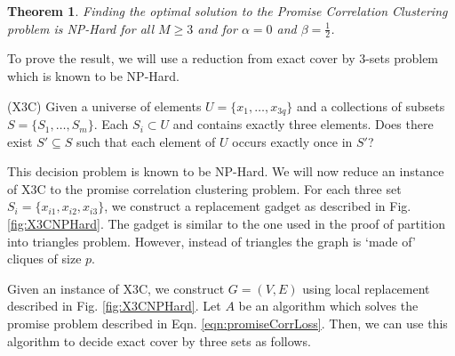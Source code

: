 \documentclass[12pt]{article}
\newtheorem{theorem}{Theorem}
\begin{document}
\begin{figure*}[!ht]
\caption{Part of graph $G$ constructed for the subset $S_i =  \{x_{i1}, x_{i2}, x_{i3}\}$. The graph is constructed by local replacement when for $p = 4$. If $S_i$ is included in the exact cover then the edges colored black and the edges colored blue represent the corresponding clustering of this part of the graph $G$. If $S_i$ is not included in the exact cover then the edges colored red and the edges colored black represent the clustering of this part of the graph.}
\label{fig:X3CNPHard}
\end{figure*}

\begin{theorem}
Finding the optimal solution to the Promise Correlation Clustering problem is NP-Hard for all $M \ge 3$ and for $\alpha = 0$ and $\beta = \frac{1}{2}$.  
\end{theorem}

\noindent To prove the result, we will use a reduction from exact cover by $3$-sets problem which is known to be NP-Hard.

(X3C) Given a universe of elements $U = \{x_1, \ldots, x_{3q}\}$ and a collections of subsets $S = \{S_1, \ldots, S_m\}$. Each $S_i \subset U$ and contains exactly three elements. Does there exist $S' \subseteq S$ such that each element of $U$ occurs exactly once in $S'$?

This decision problem is known to be NP-Hard. We will now reduce an instance of X3C to the promise correlation clustering problem. For each three set $S_i = \{x_{i1}, x_{i2}, x_{i3}\}$, we construct a replacement gadget as described in Fig. \ref{fig:X3CNPHard}. The gadget is similar to the one used in the proof of partition into triangles problem. However, instead of triangles the graph is `made of' cliques of size $p$. 



Given an instance of X3C, we construct $G = (V, E)$ using local replacement described in Fig. \ref{fig:X3CNPHard}. Let $A$ be an algorithm which solves the promise problem described in Eqn. \ref{eqn:promiseCorrLoss}. Then, we can use this algorithm to decide exact cover by three sets as follows.
\end{document}
